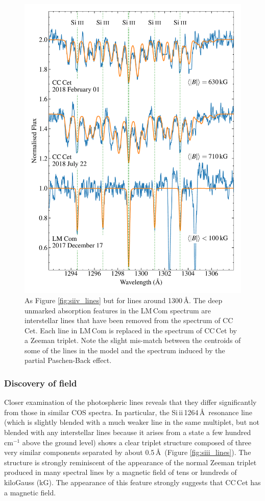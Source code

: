 \documentclass[fleqn,usenatbib]{mnras}
\begin{document}
\begin{figure}
    \centering
    \includegraphics[width=9 cm]{siiii_lines.pdf}
    \caption{As Figure \ref{fig:siiv_lines} but for  lines around 1300\,\AA. The deep unmarked absorption features in the LM\,Com spectrum are interstellar  lines that have been removed from the spectrum of CC\,Cet. Each line in LM\,Com is replaced in the spectrum of CC\,Cet by a Zeeman triplet. Note the slight mis-match between the centroids of some of the lines in the model and the spectrum induced by the partial Paschen-Back effect.}
    \label{fig:siiii_lines}
\end{figure}

\subsubsection{Discovery of field}

Closer examination of the photospheric lines reveals that they differ significantly from those in similar COS spectra. In particular, the Si\,{\sc ii}\,1264\,\AA\ resonance line (which is slightly blended with a much weaker line in the same multiplet, but not blended with any interstellar lines because it arises from a state a few hundred cm$^{-1}$ above the ground level) shows a clear triplet structure composed of three very similar components separated by about 0.5\,\AA\ (Figure \ref{fig:siii_lines}). The structure is strongly reminiscent of the appearance of the normal Zeeman triplet produced in many spectral lines by a magnetic field of tens or hundreds of kiloGauss (kG). The appearance of this feature strongly suggests that CC\,Cet has a magnetic field.  
\end{document}
